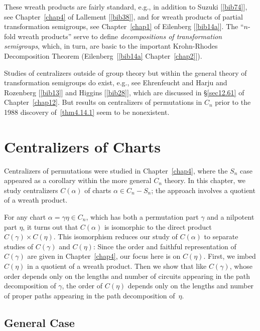 \documentclass{surv-l}
\numberwithin{equation}{section}
\numberwithin{table}{section}
\numberwithin{figure}{section}
\theoremstyle{plain}
\theoremstyle{definition}
\begin{document}
These wreath products are fairly standard, e.g., in addition to
Suzuki [\ref{bib74}], see
Chapter~\ref{chap4} of Lallement
[\ref{bib38}], and for wreath products of
partial transformation semigroups, see Chapter~\ref{chap1} of
Eilenberg [\ref{bib14a}]. The ``$n$-fold wreath
products'' serve to define \emph{decompositions of transformation
semigroups}, which, in turn, are basic to the important
Krohn-Rhodes Decomposition Theorem
(Eilenberg~[\ref{bib14a} Chapter~\ref{chap2}]).

Studies of centralizers outside of group theory but within the
general theory of transformation semigroups do exist, e.g., see
Ehrenfeucht and Harju and Rozenberg
[\ref{bib13}] and Higgins
[\ref{bib28}], which are discussed in
\S\ref{sec12.61} of Chapter~\ref{chap12}. But results on
centralizers of permutations in $C_{n}$ prior to the 1988
discovery of~\ref{thm4.14.1} seem to be nonexistent.

\chapter{Centralizers of Charts}\label{chap5}

Centralizers of permutations were studied in Chapter~\ref{chap4},
where the $S_{n}$ case appeared as a corollary within the more
general $C_{n}$ theory. In this
chapter, we study centralizers
$C(\alpha)$ of charts $\alpha\in C_{n}-S_{n}$; the approach
involves a quotient of a wreath product.

For any chart $\alpha=\gamma\eta\in C_{n}$, which has both a
permutation part $\gamma$ and a nilpotent part $\eta$, it turns
out that $C(\alpha)$ is isomorphic to the direct product
$C(\gamma)\times C(\eta)$. This isomorphism reduces our study of
$C(\alpha)$ to separate studies of $C(\gamma)$ and $C(\eta)$:
Since the order and faithful representation of $C(\gamma)$ are
given in Chapter~\ref{chap4}, our focus here is on $C(\eta)$.
First, we imbed $C(\eta)$ in a quotient of a wreath product. Then
we show that like $C(\gamma)$, whose order depends only on the
lengths and number of circuits appearing in the path decomposition
of $\gamma$, the order of $C(\eta)$ depends only on the lengths
and number of proper paths appearing in the path decomposition
of~$\eta$.

\setcounter{section}{15}

\section{General Case}\label{sec4.16}
\end{document}
